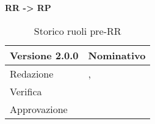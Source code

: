 \textbf{RR -> RP}
\label{tabVers2}
\begin{table}[h]
	\begin{tabular}{p{} p{}}
		\toprule \textbf{Versione 2.0.0}	&	\textbf{Nominativo}\\
		\midrule Redazione	& \VG, \BM\\
		\midrule Verifica &	\PM\\
		\midrule Approvazione	& \BM\\
		\bottomrule
	\end{tabular}
	\caption{Storico ruoli pre-RR}
\end{table}